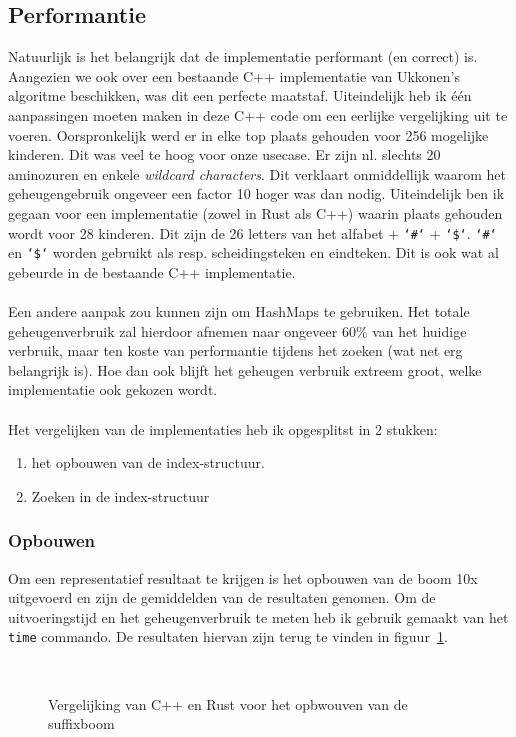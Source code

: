 \subsection{Performantie}\label{subsec:performantie}
Natuurlijk is het belangrijk dat de implementatie performant (en correct) is.
Aangezien we ook over een bestaande C++ implementatie van Ukkonen's algoritme beschikken, was dit een perfecte maatstaf.
Uiteindelijk heb ik één aanpassingen moeten maken in deze C++ code om een eerlijke vergelijking uit te voeren.
Oorspronkelijk werd er in elke top plaats gehouden voor 256 mogelijke kinderen.
Dit was veel te hoog voor onze usecase.
Er zijn nl. slechts 20 aminozuren en enkele \textit{wildcard characters}.
Dit verklaart onmiddellijk waarom het geheugengebruik ongeveer een factor 10 hoger was dan nodig.
Uiteindelijk ben ik gegaan voor een implementatie (zowel in Rust als C++) waarin plaats gehouden wordt voor 28 kinderen.
Dit zijn de 26 letters van het alfabet + \texttt{`\#`} + \texttt{`\$`}.
\texttt{`\#`} en \texttt{`\$`} worden gebruikt als resp. scheidingsteken en eindteken.
Dit is ook wat al gebeurde in de bestaande C++ implementatie.
\\ \\
Een andere aanpak zou kunnen zijn om HashMaps te gebruiken.
Het totale geheugenverbruik zal hierdoor afnemen naar ongeveer 60\% van het huidige verbruik, maar ten koste van performantie tijdens het zoeken (wat net erg belangrijk is).
Hoe dan ook blijft het geheugen verbruik extreem groot, welke implementatie ook gekozen wordt.
\\ \\
Het vergelijken van de implementaties heb ik opgesplitst in 2 stukken:
\begin{enumerate}
    \item het opbouwen van de index-structuur.
    \item Zoeken in de index-structuur
\end{enumerate}

\subsubsection{Opbouwen}
Om een representatief resultaat te krijgen is het opbouwen van de boom 10x uitgevoerd en zijn de gemiddelden van de resultaten genomen.
Om de uitvoeringstijd en het geheugenverbruik te meten heb ik gebruik gemaakt van het \texttt{time} commando.
De resultaten hiervan zijn terug te vinden in figuur~\ref{fig:tree_building}.
\begin{figure}[H]
    \centering
    \\[4ex] %

    \caption{Vergelijking van C++ en Rust voor het opbwouven van de suffixboom}\label{fig:tree_building}
\end{figure}

